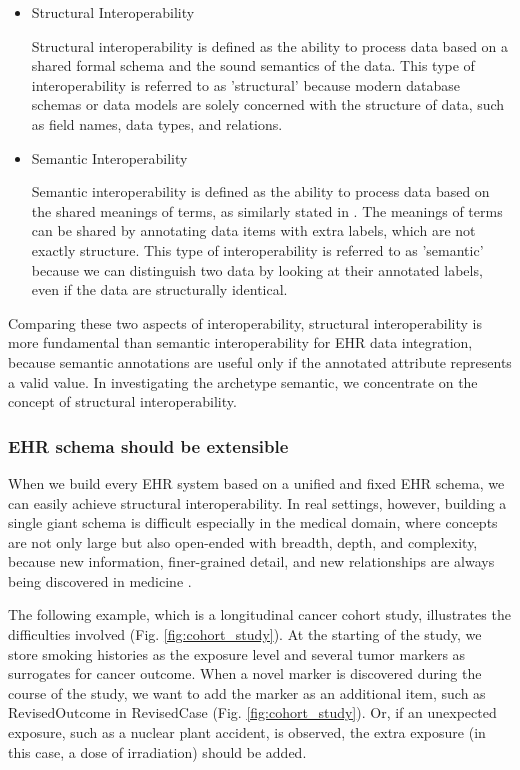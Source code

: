 \documentclass[preprint,3p,onecolumn,times,review]{elsarticle}
\begin{document}
\begin{itemize}
\item Structural Interoperability
  
  Structural interoperability is defined as the ability to process data based on a shared formal schema and the sound semantics of the data. 
  This type of interoperability is referred to as 'structural' because modern database schemas or data models are solely concerned with the structure of data, such as field names, data types, and relations.
\item Semantic Interoperability

Semantic interoperability is defined as the ability to process data based on the shared meanings of terms, as similarly stated in \cite{veltman01:_syntac_seman_inter,sebastian09:_towar_seman_inter_for_elect_healt_recor,maldonado07:_framew_for_clinic_data_stand_based_archet,martinez-costa10:_iso_en_openeh,jose09:_linkeh_ed}.
  The meanings of terms can be shared by annotating data items with extra labels, which are not exactly structure.
  This type of interoperability is referred to as 'semantic' because we can distinguish two data by looking at their annotated labels, even if the data are structurally identical.
\end{itemize}

Comparing these two aspects of interoperability, structural interoperability is more fundamental than semantic interoperability for EHR data integration, because semantic annotations are useful only if the annotated attribute represents a valid value.
In investigating the archetype semantic, we concentrate  on the concept of structural interoperability.

\subsubsection{EHR schema should be extensible}

When we build every EHR system based on a unified and fixed EHR schema, we can easily achieve structural interoperability.
In real settings, however, building a single giant schema is difficult especially in the medical domain, where concepts are not only large but also open-ended with breadth, depth, and complexity, because new information, finer-grained detail, and new relationships are always being discovered in medicine \cite{rector99:_clinic_termin,renner96:_data_inter}.

The following example, which is a longitudinal cancer cohort study, illustrates the difficulties involved (Fig. \ref{fig:cohort_study}).
At the starting of the study, we store smoking histories as the exposure level and several tumor markers as surrogates for cancer outcome.
When a novel marker is discovered during the course of the study, we want to add the marker as an additional item, such as {\sf RevisedOutcome} in {\sf RevisedCase} (Fig. \ref{fig:cohort_study}).
Or, if an unexpected exposure, such as a nuclear plant accident, is observed, the extra exposure (in this case, a dose of irradiation) should be added.
\end{document}
